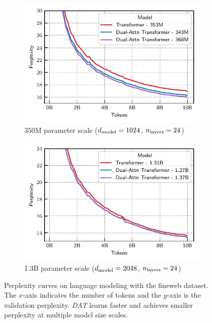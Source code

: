 
\begin{figure}[ht]
    \begin{subfigure}{0.45\textwidth}
        \centering
        \captionsetup{width=.9\linewidth}
        \includegraphics[width=\textwidth]{figs/experiments/fineweb/350M_scale_lm.pdf}
        \caption{350M parameter scale ($d_{\mathrm{model}} = 1024$, $n_{\mathrm{layers}} = 24$)}
    \end{subfigure}
    \begin{subfigure}{0.45\textwidth}
        \centering
        \captionsetup{width=.9\linewidth}
        \includegraphics[width=\textwidth]{figs/experiments/fineweb/1_3B_scale_lm.pdf}
        \caption{1.3B parameter scale ($d_{\mathrm{model}} = 2048$, $n_{\mathrm{layers}} = 24$)}
    \end{subfigure}
    \caption{Perplexity curves on language modeling with the fineweb dataset. The $x$-axis indicates the number of tokens and the $y$-axis is the validation perplexity. \textit{DAT} learns faster and achieves smaller perplexity at multiple model size scales.}\label{fig:tiny_stories_val_loss_curves}
\end{figure}

